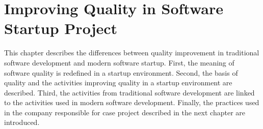 
 \chapter{Improving Quality in Software Startup Project}

This chapter describes the differences between quality improvement in traditional software development and modern software startup. First, the meaning of software quality is redefined in a startup environment. Second, the basis of quality and the activities improving quality in a startup environment are described. Third, the activities from traditional software development are linked to the activities used in modern software development. Finally, the practices used in the company responsible for case project described in the next chapter are introduced.




